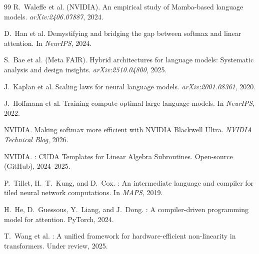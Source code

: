 \documentclass[11pt,a4paper]{article}
\theoremstyle{remark}
\begin{document}
\begin{thebibliography}{99}
R.~Waleffe et al. (NVIDIA).
\newblock An empirical study of {Mamba}-based language models.
\newblock \emph{arXiv:2406.07887}, 2024.

D.~Han et al.
\newblock Demystifying and bridging the gap between softmax and linear attention.
\newblock In \emph{NeurIPS}, 2024.

S.~Bae et al. (Meta FAIR).
\newblock Hybrid architectures for language models: Systematic analysis and design insights.
\newblock \emph{arXiv:2510.04800}, 2025.

J.~Kaplan et al.
\newblock Scaling laws for neural language models.
\newblock \emph{arXiv:2001.08361}, 2020.

J.~Hoffmann et al.
\newblock Training compute-optimal large language models.
\newblock In \emph{NeurIPS}, 2022.

NVIDIA.
\newblock Making softmax more efficient with {NVIDIA Blackwell Ultra}.
\newblock \emph{NVIDIA Technical Blog}, 2026.

NVIDIA.
: {CUDA} Templates for Linear Algebra Subroutines.
\newblock Open-source (GitHub), 2024--2025.

P.~Tillet, H.~T.~Kung, and D.~Cox.
: An intermediate language and compiler for tiled neural network computations.
\newblock In \emph{MAPS}, 2019.

H.~He, D.~Guessous, Y.~Liang, and J.~Dong.
: A compiler-driven programming model for attention.
\newblock PyTorch, 2024.

T.~Wang et al.
: A unified framework for hardware-efficient non-linearity in transformers.
\newblock Under review, 2025.

\end{thebibliography}
\end{document}
